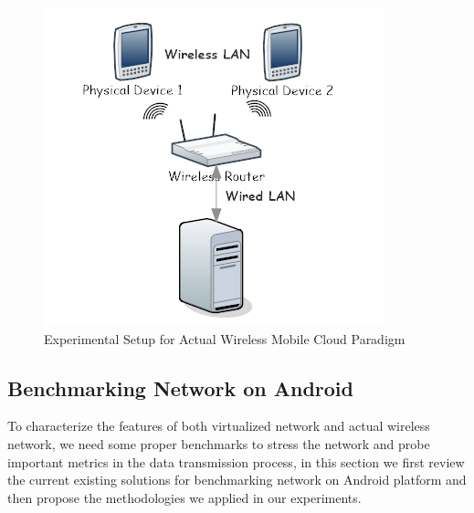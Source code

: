 \documentclass[journal,comsoc]{IEEEtran}
\begin{document}
\begin{figure}[htbp]
\begin{center}
\includegraphics[width=0.8\linewidth]{pnet_arch.png} 
\end{center}	   
\caption{Experimental Setup for Actual Wireless Mobile Cloud Paradigm}\label{pnet_arch}
\end{figure}

\subsection{Benchmarking Network on Android}
To characterize the features of both virtualized network and actual wireless network, we need some proper benchmarks to stress the network and probe important metrics in the data transmission process, in this section we first review the current existing solutions for benchmarking network on Android platform and then propose the methodologies we applied in our experiments.
\end{document}
